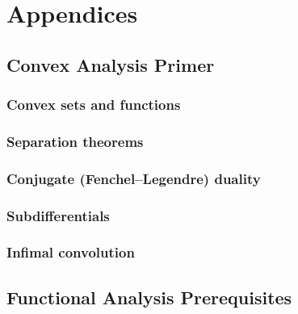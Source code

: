 \documentclass[11pt,twoside,openright]{book}
\theoremstyle{plain}
\theoremstyle{definition}
\theoremstyle{remark}
\begin{document}
\appendix

\part*{Appendices}

\chapter{Convex Analysis Primer}
\label{app:convex-primer}

\section{Convex sets and functions}
\label{sec:convex-sets-functions}

\section{Separation theorems}
\label{sec:separation}

\section{Conjugate (Fenchel--Legendre) duality}
\label{sec:fenchel-duality}

\section{Subdifferentials}
\label{sec:subdifferentials}

\section{Infimal convolution}
\label{sec:infimal-conv-appendix}


\chapter{Functional Analysis Prerequisites}
\label{app:functional-analysis}
\end{document}
